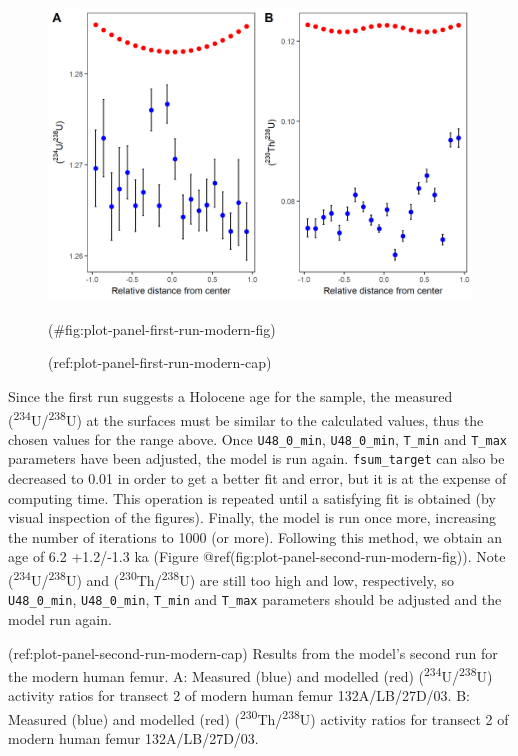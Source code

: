 \documentclass[]{elsarticle} %
\begin{document}
\begin{figure}
\includegraphics[width=0.95\linewidth]{figures/plot-panel-first-run-modern} \caption{(ref:plot-panel-first-run-modern-cap)}(\#fig:plot-panel-first-run-modern-fig)
\end{figure}

\FloatBarrier

Since the first run suggests a Holocene age for the sample, the measured (\textsuperscript{234}U/\textsuperscript{238}U) at the surfaces must be similar to the calculated values, thus the chosen values for the range above. Once \texttt{U48\_0\_min}, \texttt{U48\_0\_min}, \texttt{T\_min} and \texttt{T\_max} parameters have been adjusted, the model is run again. \texttt{fsum\_target} can also be decreased to 0.01 in order to get a better fit and error, but it is at the expense of computing time. This operation is repeated until a satisfying fit is obtained (by visual inspection of the figures). Finally, the model is run once more, increasing the number of iterations to 1000 (or more). Following this method, we obtain an age of 6.2 +1.2/-1.3 ka (Figure @ref(fig:plot-panel-second-run-modern-fig)). Note (\textsuperscript{234}U/\textsuperscript{238}U) and (\textsuperscript{230}Th/\textsuperscript{238}U) are still too high and low, respectively, so \texttt{U48\_0\_min}, \texttt{U48\_0\_min}, \texttt{T\_min} and \texttt{T\_max} parameters should be adjusted and the model run again.

(ref:plot-panel-second-run-modern-cap) Results from the model's second run for the modern human femur. A: Measured (blue) and modelled (red) (\textsuperscript{234}U/\textsuperscript{238}U) activity ratios for transect 2 of modern human femur 132A/LB/27D/03. B: Measured (blue) and modelled (red) (\textsuperscript{230}Th/\textsuperscript{238}U) activity ratios for transect 2 of modern human femur 132A/LB/27D/03.
\end{document}
